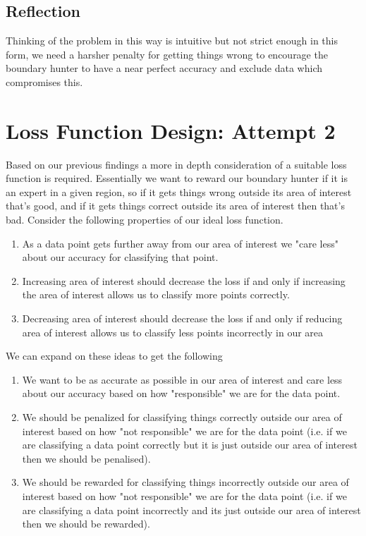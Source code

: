 \documentclass[notitlepage]{report}
\theoremstyle{definition}
\begin{document}
\subsection{Reflection}
Thinking of the problem in this way is intuitive but not strict enough in this form, we need a harsher penalty for getting things wrong to encourage the boundary hunter to have a near perfect accuracy and exclude data which compromises this.

\section{Loss Function Design: Attempt 2}
Based on our previous findings a more in depth consideration of a suitable loss function is required. Essentially we want to reward our boundary hunter if it is an expert in a given region, so if it gets things wrong outside its area of interest that's good, and if it gets things correct outside its area of interest then that's bad. Consider the following properties of our ideal loss function.

\begin{enumerate}
\item As a data point gets further away from our area of interest we "care less" about our accuracy for classifying that point.
\item Increasing area of interest should decrease the loss if and only if increasing the area of interest allows us to classify more points correctly.
\item Decreasing area of interest should decrease the loss if and only if reducing area of interest allows us to classify less points incorrectly in our area
\end{enumerate}

We can expand on these ideas to get the following

\begin{enumerate}
\item We want to be as accurate as possible in our area of interest and care less about our accuracy based on how "responsible" we are for the data point.
\item We should be penalized for classifying things correctly outside our area of interest based on how "not responsible" we are for the data point (i.e. if we are classifying a data point correctly but it is just outside our area of interest then we should be penalised).
\item We should be rewarded for classifying things incorrectly outside our area of interest based on how "not responsible" we are for the data point (i.e. if we are classifying a data point incorrectly and its just outside our area of interest then we should be rewarded).
\end{enumerate}
\end{document}
